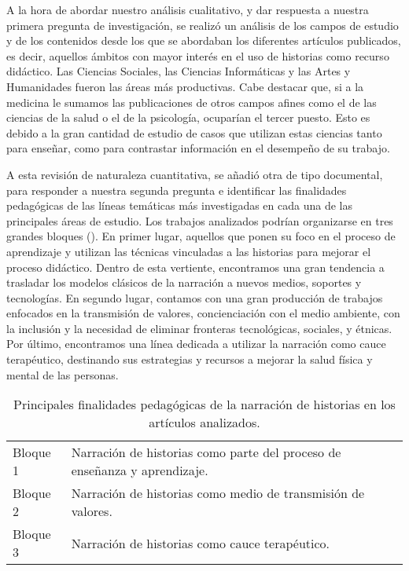 A la hora de abordar nuestro análisis cualitativo, y dar respuesta a
nuestra primera pregunta de investigación, se realizó un análisis de los
campos de estudio y de los contenidos desde los que se abordaban los
diferentes artículos publicados, es decir, aquellos ámbitos con mayor
interés en el uso de historias como recurso didáctico. Las Ciencias
Sociales, las Ciencias Informáticas y las Artes y Humanidades fueron las
áreas más productivas. Cabe destacar que, si a la medicina le sumamos
las publicaciones de otros campos afines como el de las ciencias de la
salud o el de la psicología, ocuparían el tercer puesto. Esto es debido
a la gran cantidad de estudio de casos que utilizan estas ciencias tanto
para enseñar, como para contrastar información en el desempeño de su
trabajo.

A esta revisión de naturaleza cuantitativa, se añadió otra de tipo
documental, para responder a nuestra segunda pregunta e identificar las
finalidades pedagógicas de las líneas temáticas más investigadas en cada
una de las principales áreas de estudio. Los trabajos analizados podrían
organizarse en tres grandes bloques (). En primer lugar, aquellos que ponen su foco en el proceso de aprendizaje y utilizan las técnicas vinculadas a las historias para mejorar el proceso didáctico. Dentro de esta vertiente, encontramos una gran tendencia a trasladar los modelos
clásicos de la narración a nuevos medios, soportes y tecnologías. En
segundo lugar, contamos con una gran producción de trabajos enfocados en
la transmisión de valores, concienciación con el medio ambiente, con la
inclusión y la necesidad de eliminar fronteras tecnológicas, sociales, y
étnicas. Por último, encontramos una línea dedicada a utilizar la
narración como cauce terapéutico, destinando sus estrategias y recursos
a mejorar la salud física y mental de las personas.

\begin{table}[htbp]
\centering
\begin{threeparttable}
\caption{Principales finalidades pedagógicas de la narración de historias en los artículos analizados.}
\label{tab-07}
\begin{tabular}{ll}
\toprule
Bloque 1 & Narración de historias como parte del proceso de enseñanza y
aprendizaje.\\
Bloque 2 & Narración de historias como medio de transmisión de valores.\\
Bloque 3 & Narración de historias como cauce terapéutico.\\
\bottomrule
\end{tabular}
\end{threeparttable}
\end{table}

